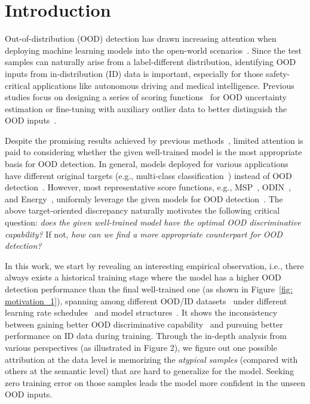 \documentclass{article}
\theoremstyle{plain}
\theoremstyle{definition}
\theoremstyle{remark}
\begin{document}
\section{Introduction}



Out-of-distribution (OOD) detection has drawn increasing attention when deploying machine learning models into the open-world scenarios~\citep{Nguyen_2015_CVPR,LeeLLS18, yang2021generalized}. Since the test samples can naturally arise from a label-different distribution, identifying OOD inputs from in-distribution (ID) data is important, especially for those safety-critical applications like autonomous driving and medical intelligence. Previous studies focus on designing a series of scoring functions~\citep{hendrycks17baseline,LiangLS18,liu2020energy,SunM0L22} for OOD uncertainty estimation or fine-tuning with auxiliary outlier data to better distinguish the OOD inputs~\citep{hendrycks2018deep,MohseniPYW20,SehwagCM21}.



Despite the promising results achieved by previous methods~\citep{hendrycks17baseline,hendrycks2018deep,liu2020energy,ming2022poem}, limited attention is paid to considering whether the given well-trained model is the most appropriate basis for OOD detection. In general, models deployed for various applications have different original targets (e.g., multi-class classification~\citep{goodfellow2016deep}) instead of OOD detection~\citep{Nguyen_2015_CVPR}. However, most representative score functions, e.g., MSP~\citep{hendrycks2018deep}, ODIN~\citep{LiangLS18}, and Energy~\citep{liu2020energy}, uniformly leverage the given models for OOD detection~\citep{yang2021generalized}. The above target-oriented discrepancy naturally motivates the following critical question: \textit{does the given well-trained model have the optimal OOD discriminative capability?} If not, \textit{how can we find a more appropriate counterpart for OOD detection?}



In this work, we start by revealing an interesting empirical observation, i.e., there always exists a historical training stage where the model has a higher OOD detection performance than the final well-trained one (as shown in Figure~\ref{fig: motivation_1}), spanning among different OOD/ID datasets~\citep{netzer2011reading_SVHN,van2018inaturalist} under different learning rate schedules~\citep{LoshchilovH17} and model structures~\citep{huang2017densely,zagoruyko2016wide}. It shows the inconsistency between gaining better OOD discriminative capability~\citep{Nguyen_2015_CVPR} and pursuing better performance on ID data during training.
Through the in-depth analysis from various perspectives (as illustrated in Figure 2), we figure out one possible attribution at the data level is memorizing the \textit{atypical samples} (compared with others at the semantic level) that are hard to generalize for the model. Seeking zero training error on those samples leads the model more confident in the unseen OOD inputs.
\end{document}

